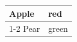 \documentclass{article}
\begin{document}
\begin{tabular}{ll}
\hline
Apple & red \\
\cline{1-2}
Pear & green \\
\hline
\end{tabular}
\end{document}
